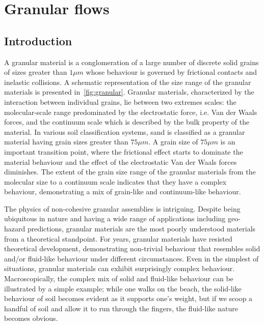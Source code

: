 \chapter{Granular flows}

\ifpdf
    \graphicspath{{Chapter2/figs/raster/}{Chapter2/figs/pdf/}{Chapter2/figs/}}
\else
    \graphicspath{{Chapter2/figs/vector/}{Chapter2/figs/}}
\fi

\section{Introduction}

A granular material is a conglomeration of a large number of discrete solid 
grains of sizes greater than $1\mu m$ whose behaviour is governed by 
frictional contacts and inelastic collisions. A schematic representation of the 
size range of the granular materials is presented in~\cref{fig:granular}. 
Granular materials, characterized by the interaction between individual grains, 
lie between two extremes scales: the molecular-scale range predominated by 
the electrostatic force, i.e. Van der Waals forces, and the continuum scale 
which is described by the bulk property of the material. In various soil 
classification systems, sand is classified as a granular material having grain 
sizes greater than $75\mu m$. A grain size of $75\mu m$ is an important 
transition point, where the frictional effect starts to dominate the material 
behaviour and the effect of the electrostatic Van der Waals forces diminishes. 
The extent of the grain size range of the granular materials from the molecular 
size to a continuum scale indicates that they have a complex behaviour, 
demonstrating a mix of grain-like and continuum-like behaviour.

The physics of non-cohesive granular assemblies is 
intriguing. Despite being ubiquitous in nature and having a wide range of 
applications including geo-hazard predictions, granular materials are the 
most poorly understood materials from a theoretical standpoint. For years, 
granular materials have resisted theoretical development, demonstrating 
non-trivial behaviour that resembles solid and/or fluid-like behaviour under 
different circumstances. Even in the simplest of situations, granular materials 
can exhibit surprisingly complex behaviour. Macroscopically, the complex mix of 
solid and fluid-like behaviour can be illustrated by a simple example; while 
one walks on the beach, the solid-like behaviour of soil becomes evident as it 
supports one's weight, but if we scoop a handful of soil and allow it to run 
through the fingers, the fluid-like nature becomes obvious.


